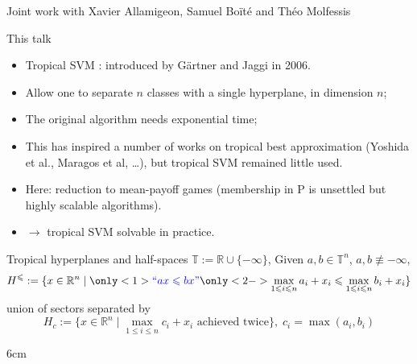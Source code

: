 \documentclass[12pt]{beamer}
\newcommand{\TT}{\mathbb{T}}
\newcommand{\bl}[1]{{\color{blue} #1}}
\newcommand{\overl}[2]{\begin{overlayarea}{\textwidth}{#1}#2
\end{overlayarea}}
\newenvironment{trop}{\color{blue}\text{``}}{\text{''}}
\newcommand{\auth}[1]{{\color{purple} #1}}
\def\ltr{\begin{trop}}
\def\rtr{\end{trop}}
\newcommand{\R}{\mathbb{R}}
\newcommand{\giveref}[1]{{\normalsize\color{purple}#1}}
\begin{document}
\begin{frame}[plain]
\maketitle
\vfill
\small%
Joint work with \auth{Xavier Allamigeon}, \auth{Samuel Bo\"it\'e} and \auth{Th\'eo Molfessis}

%
%
%
%
%
%


%
%
%
%
%
%
%
%
%
%
%
%
%
%

\vfill

\end{frame}
\large
\begin{frame}[plain]{This talk}

\begin{itemize}[<+->]
\item
  Tropical SVM : introduced by \giveref{G\"artner and Jaggi} in 2006.
\item Allow one to separate $n$ classes with a single hyperplane, in dimension $n$;
\item The \alert{original algorithm needs exponential time};
\item  
  This has inspired a number of works on tropical best approximation (\giveref{Yoshida et al.}, \giveref{Maragos et al}, \dots), but tropical SVM remained little used.
\item Here: \bl{reduction to mean-payoff games} (membership in P is unsettled but
  highly scalable algorithms).
\item $\to$ \bl{tropical SVM solvable in practice}.  
\end{itemize}
%
\vfill
\end{frame}
\normalsize
\begin{frame}[plain]{Tropical hyperplanes and half-spaces}
$\TT:=\R\cup\{-\infty\}$, Given $a,b\in \TT^n$, $a,b\not\equiv -\infty$, 
%
\[
H^{\leq}:=\{x\in\R^n\mid  \only<1>{\ltr ax \leq b x \rtr}\only<2->{\max_{1\leq i\leq n} a_i+ x_i \leq \max_{1\leq i\leq n} b_i+x_i}  \}
\]
union of sectors separated by
\[
H_c:= \{x\in \R^n\mid  \max_{1\leq i\leq n} c_i + x_i \text{ achieved twice}\}, \; c_i=\max(a_i,b_i)
\]
%
%
%
%
%
%

%


%
\overl{6cm}{
\begin{center}
%
\only<3>{}%
%
\only<5>{}%
\end{center}}
  
\end{frame}
\end{document}
